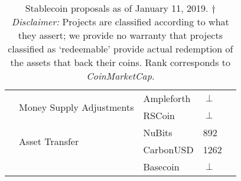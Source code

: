 \begin{table}[t]
\begin{tabular}{|l|l|l|l|l|}
						& \multirow{2}{*}{Money Supply Adjustments}  				& Ampleforth		& $\perp$  \\ \cline{3-4}
						&   													& RSCoin 			& $\perp$  \\ \cline{2-4}
						& \multirow{2}{*}{Asset Transfer}  							& NuBits			& 892 \\ \cline{3-4}
						&													& CarbonUSD		& 1262 \\ \cline{3-4}
						&													& Basecoin 		& $\perp$ \\ \cline{1-4}
\hline
\end{tabular}
\caption{Stablecoin proposals as of January 11, 2019. $\dagger$ \textit{Disclaimer:} Projects are classified according to what they assert; \eg we provide no warranty that projects classified as `redeemable' provide actual redemption of the assets that back their coins. Rank corresponds to \textit{CoinMarketCap}.\label{tab:stablecoins}}
\end{table}



